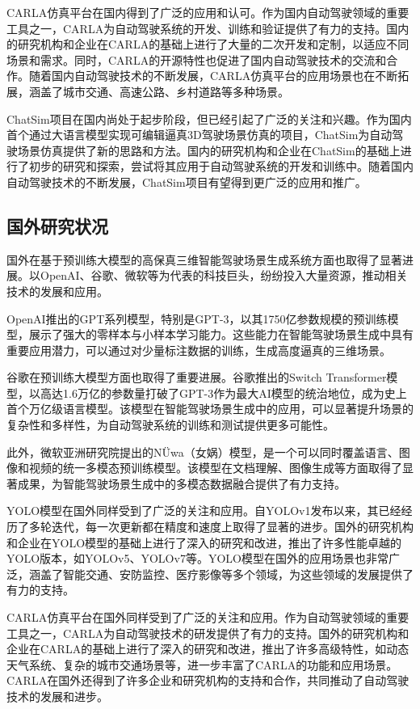 \documentclass{article}
\begin{document}
CARLA仿真平台在国内得到了广泛的应用和认可。作为国内自动驾驶领域的重要工具之一，CARLA为自动驾驶系统的开发、训练和验证提供了有力的支持。国内的研究机构和企业在CARLA的基础上进行了大量的二次开发和定制，以适应不同场景和需求。同时，CARLA的开源特性也促进了国内自动驾驶技术的交流和合作。随着国内自动驾驶技术的不断发展，CARLA仿真平台的应用场景也在不断拓展，涵盖了城市交通、高速公路、乡村道路等多种场景。

ChatSim项目在国内尚处于起步阶段，但已经引起了广泛的关注和兴趣。作为国内首个通过大语言模型实现可编辑逼真3D驾驶场景仿真的项目，ChatSim为自动驾驶场景仿真提供了新的思路和方法。国内的研究机构和企业在ChatSim的基础上进行了初步的研究和探索，尝试将其应用于自动驾驶系统的开发和训练中。随着国内自动驾驶技术的不断发展，ChatSim项目有望得到更广泛的应用和推广。

\subsection*{国外研究状况}
国外在基于预训练大模型的高保真三维智能驾驶场景生成系统方面也取得了显著进展。以OpenAI、谷歌、微软等为代表的科技巨头，纷纷投入大量资源，推动相关技术的发展和应用。

OpenAI推出的GPT系列模型，特别是GPT-3，以其1750亿参数规模的预训练模型，展示了强大的零样本与小样本学习能力。这些能力在智能驾驶场景生成中具有重要应用潜力，可以通过对少量标注数据的训练，生成高度逼真的三维场景。

谷歌在预训练大模型方面也取得了重要进展。谷歌推出的Switch Transformer模型，以高达1.6万亿的参数量打破了GPT-3作为最大AI模型的统治地位，成为史上首个万亿级语言模型。该模型在智能驾驶场景生成中的应用，可以显著提升场景的复杂性和多样性，为自动驾驶系统的训练和测试提供更多可能性。

此外，微软亚洲研究院提出的NÜwa（女娲）模型，是一个可以同时覆盖语言、图像和视频的统一多模态预训练模型。该模型在文档理解、图像生成等方面取得了显著成果，为智能驾驶场景生成中的多模态数据融合提供了有力支持。

YOLO模型在国外同样受到了广泛的关注和应用。自YOLOv1发布以来，其已经经历了多轮迭代，每一次更新都在精度和速度上取得了显著的进步。国外的研究机构和企业在YOLO模型的基础上进行了深入的研究和改进，推出了许多性能卓越的YOLO版本，如YOLOv5、YOLOv7等。YOLO模型在国外的应用场景也非常广泛，涵盖了智能交通、安防监控、医疗影像等多个领域，为这些领域的发展提供了有力的支持。

CARLA仿真平台在国外同样受到了广泛的关注和应用。作为自动驾驶领域的重要工具之一，CARLA为自动驾驶技术的研发提供了有力的支持。国外的研究机构和企业在CARLA的基础上进行了深入的研究和改进，推出了许多高级特性，如动态天气系统、复杂的城市交通场景等，进一步丰富了CARLA的功能和应用场景。CARLA在国外还得到了许多企业和研究机构的支持和合作，共同推动了自动驾驶技术的发展和进步。
\end{document}
